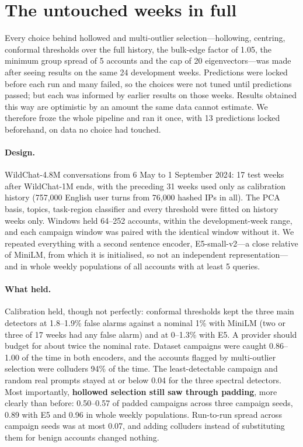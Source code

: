 \section{The untouched weeks in full}
\label{sec:holdout-full}

Every choice behind hollowed and multi-outlier selection---hollowing, centring, conformal thresholds over the full history, the bulk-edge factor of 1.05, the minimum group spread of 5 accounts and the cap of 20 eigenvectors---was made after seeing results on the same 24 development weeks. Predictions were locked before each run and many failed, so the choices were not tuned until predictions passed; but each was informed by earlier results on those weeks. Results obtained this way are optimistic by an amount the same data cannot estimate. We therefore froze the whole pipeline and ran it once, with 13 predictions locked beforehand, on data no choice had touched.

\paragraph{Design.} WildChat-4.8M conversations from 6 May to 1 September 2024: 17 test weeks after WildChat-1M ends, with the preceding 31 weeks used only as calibration history (757{,}000 English user turns from 76{,}000 hashed IPs in all). The PCA basis, topics, task-region classifier and every threshold were fitted on history weeks only. Windows held 64--252 accounts, within the development-week range, and each campaign window was paired with the identical window without it. We repeated everything with a second sentence encoder, E5-small-v2---a close relative of MiniLM, from which it is initialised, so not an independent representation---and in whole weekly populations of all accounts with at least 5 queries.



\paragraph{What held.} Calibration held, though not perfectly: conformal thresholds kept the three main detectors at 1.8--1.9\% false alarms against a nominal 1\% with MiniLM (two or three of 17 weeks had any false alarm) and at 0--1.3\% with E5. A provider should budget for about twice the nominal rate. Dataset campaigns were caught 0.86--1.00 of the time in both encoders, and the accounts flagged by multi-outlier selection were colluders 94\% of the time. The least-detectable campaign and random real prompts stayed at or below 0.04 for the three spectral detectors. Most importantly, \textbf{hollowed selection still saw through padding}, more clearly than before: 0.50--0.57 of padded campaigns across three campaign seeds, 0.89 with E5 and 0.96 in whole weekly populations. Run-to-run spread across campaign seeds was at most 0.07, and adding colluders instead of substituting them for benign accounts changed nothing.

